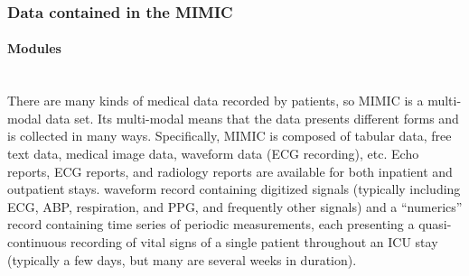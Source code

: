 





\subsubsection{Data contained in the MIMIC}
\setcounter{tocdepth}{4}
\setcounter{secnumdepth}{4}
\paragraph{Modules}~\\
There are many kinds of medical data recorded by patients, so MIMIC is a multi-modal data set. Its multi-modal means that the data presents different forms and is collected in many ways. Specifically, MIMIC is composed of tabular data, free text data, medical image data, waveform data (ECG recording), etc. Echo reports, ECG reports, and radiology reports are available for both inpatient and outpatient stays. waveform record containing digitized signals (typically including ECG, ABP, respiration, and PPG, and frequently other signals) and a “numerics” record containing time series of periodic measurements, each presenting a quasi-continuous recording of vital signs of a single patient throughout an ICU stay (typically a few days, but many are several weeks in duration). 

